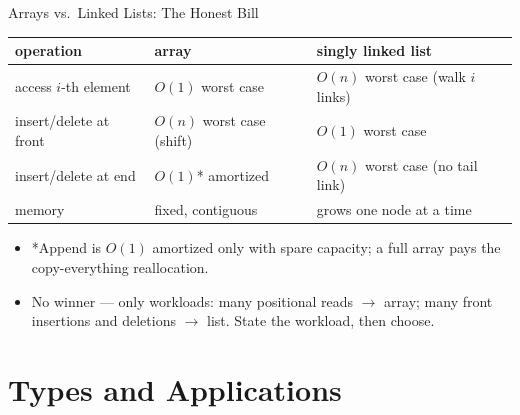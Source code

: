 \documentclass[aspectratio=169]{beamer}
\begin{document}
\begin{frame}{Arrays vs.\ Linked Lists: The Honest Bill}
  \begin{center}
  {\footnotesize
  \begin{tabular}{lll}
    \toprule
    \textbf{operation} & \textbf{array} & \textbf{singly linked list} \\
    \midrule
    access $i$-th element & $O(1)$ worst case & $O(n)$ worst case (walk $i$ links) \\
    insert/delete at front & $O(n)$ worst case (shift) & $O(1)$ worst case \\
    insert/delete at end & $O(1)$* amortized & $O(n)$ worst case (no tail link) \\
    memory & fixed, contiguous & grows one node at a time \\
    \bottomrule
  \end{tabular}}
  \end{center}
  \begin{itemize}
    \item *Append is $O(1)$ amortized only with spare capacity; a full array
      pays the copy-everything reallocation.
    \item No winner --- only workloads: many positional reads $\to$ array;
      many front insertions and deletions $\to$ list. State the workload,
      then choose.
  \end{itemize}
\end{frame}


\section{Types and Applications}

\end{document}
